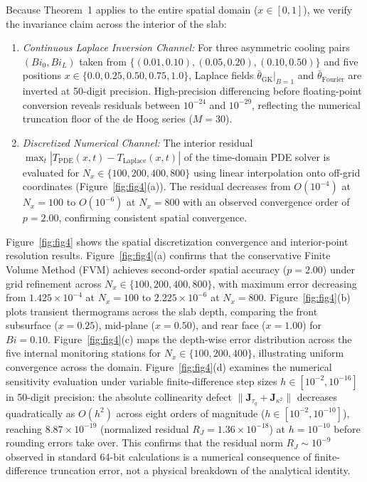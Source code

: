 \documentclass[preprint,12pt]{elsarticle}
\begin{document}
Because Theorem~1 applies to the entire spatial domain ($x \in [0, 1]$), we verify the invariance claim across the interior of the slab:
\begin{enumerate}
    \item \textit{Continuous Laplace Inversion Channel:} For three asymmetric cooling pairs $(Bi_0, Bi_L)$ taken from $\{(0.01, 0.10), (0.05, 0.20), (0.10, 0.50)\}$ and five positions $x \in \{0.0, 0.25, 0.50, 0.75, 1.0\}$, Laplace fields $\bar{\theta}_{\mathrm{GK}}|_{B=1}$ and $\bar{\theta}_{\mathrm{Fourier}}$ are inverted at 50-digit precision. High-precision differencing before floating-point conversion reveals residuals between $10^{-24}$ and $10^{-29}$, reflecting the numerical truncation floor of the de Hoog series ($M=30$).
    \item \textit{Discretized Numerical Channel:} The interior residual $\max_t |T_{\mathrm{PDE}}(x, t) - T_{\mathrm{Laplace}}(x, t)|$ of the time-domain PDE solver is evaluated for $N_x \in \{100, 200, 400, 800\}$ using linear interpolation onto off-grid coordinates (Figure~\ref{fig:fig4}(a)). The residual decreases from $O(10^{-4})$ at $N_x = 100$ to $O(10^{-6})$ at $N_x = 800$ with an observed convergence order of $p = 2.00$, confirming consistent spatial convergence.
\end{enumerate}


Figure~\ref{fig:fig4} shows the spatial discretization convergence and interior-point resolution results. Figure~\ref{fig:fig4}(a) confirms that the conservative Finite Volume Method (FVM) achieves second-order spatial accuracy ($p = 2.00$) under grid refinement across $N_x \in \{100, 200, 400, 800\}$, with maximum error decreasing from $1.425 \times 10^{-4}$ at $N_x = 100$ to $2.225 \times 10^{-6}$ at $N_x = 800$. Figure~\ref{fig:fig4}(b) plots transient thermograms across the slab depth, comparing the front subsurface ($x = 0.25$), mid-plane ($x = 0.50$), and rear face ($x = 1.00$) for $Bi = 0.10$. Figure~\ref{fig:fig4}(c) maps the depth-wise error distribution across the five internal monitoring stations for $N_x \in \{100, 200, 400\}$, illustrating uniform convergence across the domain. Figure~\ref{fig:fig4}(d) examines the numerical sensitivity evaluation under variable finite-difference step sizes $h \in [10^{-2}, 10^{-16}]$ in 50-digit precision: the absolute collinearity defect $\|\mathbf{J}_{\tau_q} + \mathbf{J}_{\kappa^2}\|$ decreases quadratically as $O(h^2)$ across eight orders of magnitude ($h \in [10^{-2}, 10^{-10}]$), reaching $8.87 \times 10^{-19}$ (normalized residual $R_J = 1.36 \times 10^{-18}$) at $h = 10^{-10}$ before rounding errors take over. This confirms that the residual norm $R_J \sim 10^{-9}$ observed in standard 64-bit calculations is a numerical consequence of finite-difference truncation error, not a physical breakdown of the analytical identity.
\end{document}
